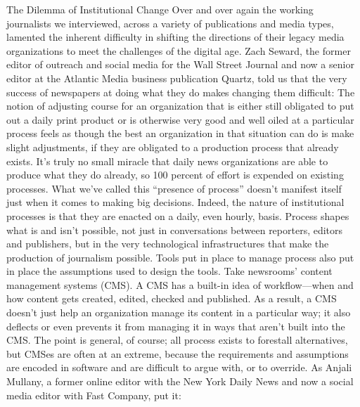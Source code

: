 The Dilemma of Institutional Change
Over and over again the working journalists we interviewed, across a variety of
publications and media types, lamented the inherent difficulty in shifting the
directions of their legacy media organizations to meet the challenges of the digital
age. Zach Seward, the former editor of outreach and social media for the Wall
Street Journal and now a senior editor at the Atlantic Media business publication
Quartz, told us that the very success of newspapers at doing what they do makes
changing them difficult:
The notion of adjusting course for an organization that is either still
obligated to put out a daily print product or is otherwise very good and
well oiled at a particular process feels as though the best an organization
in that situation can do is make slight adjustments, if they are obligated
to a production process that already exists. It’s truly no small miracle
that daily news organizations are able to produce what they do already,
so 100 percent of effort is expended on existing processes.
What we’ve called this ``presence of process'' doesn’t manifest itself just when it
comes to making big decisions. Indeed, the nature of institutional processes is
that they are enacted on a daily, even hourly, basis. Process shapes what is and isn’t
possible, not just in conversations between reporters, editors and publishers, but
in the very technological infrastructures that make the production of journalism
possible. Tools put in place to manage process also put in place the assumptions
used to design the tools.
Take newsrooms’ content management systems (CMS). A CMS has a built-in
idea of workflow—when and how content gets created, edited, checked and
published. As a result, a CMS doesn’t just help an organization manage its content
in a particular way; it also deflects or even prevents it from managing it in ways
that aren’t built into the CMS.
The point is general, of course; all process exists to forestall alternatives, but
CMSes are often at an extreme, because the requirements and assumptions are
encoded in software and are difficult to argue with, or to override. As Anjali
Mullany, a former online editor with the New York Daily News and now a social
media editor with Fast Company, put it:

